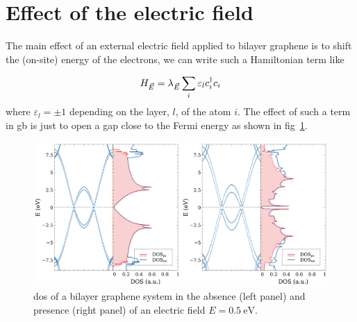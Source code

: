  \section{Effect of the electric field}
The main effect of an external electric field applied to bilayer graphene is to shift the (on-site) energy of the electrons, we can write such a Hamiltonian term like

\begin{equation}
  H_{\vec{E}} = \lambda_{\vec{E}}\sum_i \varepsilon_l c^{\dagger}_{i}c_{i}
\end{equation}
where $\varepsilon_l=\pm1$ depending on the layer, $l$,  of the atom $i$.
The effect of such a term in \ac{gb} is just to open a gap close to the Fermi energy as shown in fig~\ref{bi_Efield}.

\begin{figure}[h!]
  \centering
  \includegraphics[width=\textwidth]{chapter06/figures/bilayer_elec.pdf}
  \vspace{-10pt}
  \caption{\ac{dos} of a bilayer graphene system in the absence (left panel) and presence (right panel) of an electric field $E=\SI{0.5}{\eV}$.} %
  \label{bi_Efield}
\end{figure}
\FloatBarrier



